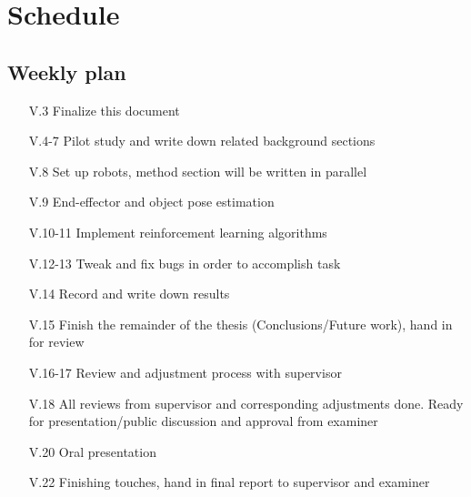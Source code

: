 \section{Schedule}
\subsection{Weekly plan}
\begin{itemize}
    \item[V.3] Finalize this document
    \item[V.4-7] Pilot study and write down related background sections
    \item[V.8] Set up robots, method section will be written in parallel
    \item[V.9] End-effector and object pose estimation
    \item[V.10-11] Implement reinforcement learning algorithms
    \item[V.12-13] Tweak and fix bugs in order to accomplish task
    \item[V.14] Record and write down results
    \item[V.15] Finish the remainder of the thesis (Conclusions/Future work), hand in for review
    \item[V.16-17] Review and adjustment process with supervisor
    \item[V.18] All reviews from supervisor and corresponding adjustments done. Ready
                for presentation/public discussion and approval from examiner
    \item[V.20] Oral presentation
    \item[V.22] Finishing touches, hand in final report to supervisor and examiner
\end{itemize}
